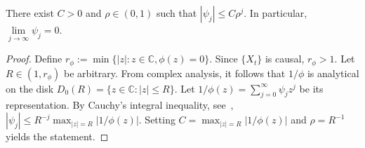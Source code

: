 \begin{Lem}\label{lem:upper_bound_psi_j}
    There exist $C>0$ and $\rho\in(0,1)$ such that $|\psi_j|\le C\rho^{j}$. In particular, $\lim\limits_{j\to\infty}\psi_j=0$.
\end{Lem}

\begin{proof}
    Define $r_{\phi}:=\min\{|z|:z\in\mathbb{C},\phi(z)=0\}$. Since $\{X_t\}$ is causal, $r_{\phi}>1$. Let $R\in(1,r_{\phi})$ be arbitrary. From complex analysis, it follows that $1/\phi$ is analytical on the disk $D_0(R)=\{z\in\mathbb{C}:|z|\le R\}$. Let $1/\phi(z)=\sum_{j=0}^{\infty}\psi_jz^{j}$ be its representation. By Cauchy's integral inequality, see~\cite[Corollary~4.3]{Shiu01072004}, $|\psi_j|\le R^{-j}\max_{|z|=R}|1/\phi(z)|$. Setting $C=\max_{|z|=R}|1/\phi(z)|$ and $\rho=R^{-1}$ yields the statement.
\end{proof}


